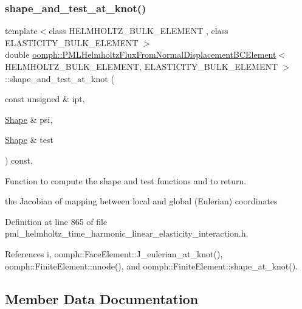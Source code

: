 \subsubsection{\texorpdfstring{shape\+\_\+and\+\_\+test\+\_\+at\+\_\+knot()}{shape\_and\_test\_at\_knot()}}
{\footnotesize\ttfamily template$<$class H\+E\+L\+M\+H\+O\+L\+T\+Z\+\_\+\+B\+U\+L\+K\+\_\+\+E\+L\+E\+M\+E\+NT , class E\+L\+A\+S\+T\+I\+C\+I\+T\+Y\+\_\+\+B\+U\+L\+K\+\_\+\+E\+L\+E\+M\+E\+NT $>$ \\
double \hyperlink{classoomph_1_1PMLHelmholtzFluxFromNormalDisplacementBCElement}{oomph\+::\+P\+M\+L\+Helmholtz\+Flux\+From\+Normal\+Displacement\+B\+C\+Element}$<$ H\+E\+L\+M\+H\+O\+L\+T\+Z\+\_\+\+B\+U\+L\+K\+\_\+\+E\+L\+E\+M\+E\+NT, E\+L\+A\+S\+T\+I\+C\+I\+T\+Y\+\_\+\+B\+U\+L\+K\+\_\+\+E\+L\+E\+M\+E\+NT $>$\+::shape\+\_\+and\+\_\+test\+\_\+at\+\_\+knot (\begin{DoxyParamCaption}\item[{const unsigned \&}]{ipt,  }\item[{\hyperlink{classoomph_1_1Shape}{Shape} \&}]{psi,  }\item[{\hyperlink{classoomph_1_1Shape}{Shape} \&}]{test }\end{DoxyParamCaption}) const\hspace{0.3cm}{\ttfamily [inline]}, {\ttfamily [protected]}}



Function to compute the shape and test functions and to return. 

the Jacobian of mapping between local and global (Eulerian) coordinates 

Definition at line 865 of file pml\+\_\+helmholtz\+\_\+time\+\_\+harmonic\+\_\+linear\+\_\+elasticity\+\_\+interaction.\+h.



References i, oomph\+::\+Face\+Element\+::\+J\+\_\+eulerian\+\_\+at\+\_\+knot(), oomph\+::\+Finite\+Element\+::nnode(), and oomph\+::\+Finite\+Element\+::shape\+\_\+at\+\_\+knot().



\subsection{Member Data Documentation}
\mbox{\label{classoomph_1_1PMLHelmholtzFluxFromNormalDisplacementBCElement_a61904b123c934fd59b5c72f626ebb728}} 
